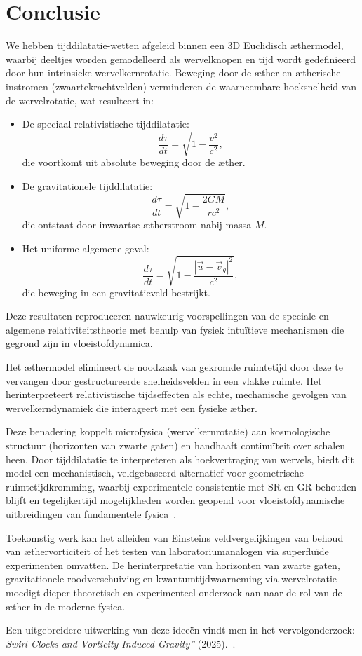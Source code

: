 \section{Conclusie}

We hebben tijddilatatie-wetten afgeleid binnen een 3D Euclidisch æthermodel, waarbij deeltjes worden gemodelleerd als wervelknopen en tijd wordt gedefinieerd door hun intrinsieke wervelkernrotatie. Beweging door de æther en ætherische instromen (zwaartekrachtvelden) verminderen de waarneembare hoeksnelheid van de wervelrotatie, wat resulteert in:

\begin{itemize}
    \item De speciaal-relativistische tijddilatatie:
    \[
        \frac{d\tau}{dt} = \sqrt{1 - \frac{v^2}{c^2}},
    \]
    die voortkomt uit absolute beweging door de æther.

    \item De gravitationele tijddilatatie:
    \[
        \frac{d\tau}{dt} = \sqrt{1 - \frac{2GM}{rc^2}},
    \]
    die ontstaat door inwaartse ætherstroom nabij massa $M$.

    \item Het uniforme algemene geval:
    \[
        \frac{d\tau}{dt} = \sqrt{1 - \frac{|\vec{u} - \vec{v}_g|^2}{c^2}},
    \]
    die beweging in een gravitatieveld bestrijkt.
\end{itemize}

Deze resultaten reproduceren nauwkeurig voorspellingen van de speciale en algemene relativiteitstheorie met behulp van fysiek intuïtieve mechanismen die gegrond zijn in vloeistofdynamica.

Het æthermodel elimineert de noodzaak van gekromde ruimtetijd door deze te vervangen door gestructureerde snelheidsvelden in een vlakke ruimte. Het herinterpreteert relativistische tijdseffecten als echte, mechanische gevolgen van wervelkerndynamiek die interageert met een fysieke æther.

Deze benadering koppelt microfysica (wervelkernrotatie) aan kosmologische structuur (horizonten van zwarte gaten) en handhaaft continuïteit over schalen heen. Door tijddilatatie te interpreteren als hoekvertraging van wervels, biedt dit model een mechanistisch, veldgebaseerd alternatief voor geometrische ruimtetijdkromming, waarbij experimentele consistentie met SR en GR behouden blijft en tegelijkertijd mogelijkheden worden geopend voor vloeistofdynamische uitbreidingen van fundamentele fysica~\cite{Winterberg2002-PlanckÆther,Schiller2022-maxforce}.

Toekomstig werk kan het afleiden van Einsteins veldvergelijkingen van behoud van æthervorticiteit of het testen van laboratoriumanalogen via superfluïde experimenten omvatten. De herinterpretatie van horizonten van zwarte gaten, gravitationele roodverschuiving en kwantumtijdwaarneming via wervelrotatie moedigt dieper theoretisch en experimenteel onderzoek aan naar de rol van de æther in de moderne fysica.

Een uitgebreidere uitwerking van deze ideeën vindt men in het vervolgonderzoek: \textit{\grqq Swirl Clocks and Vorticity-Induced Gravity\textquotedblright} (2025).~\cite{vam2025unified}.